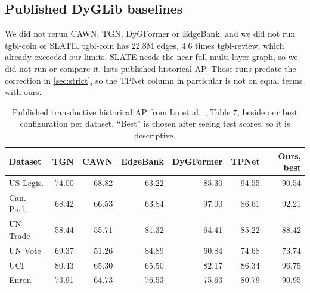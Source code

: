 \documentclass[11pt,a4paper]{article}
\theoremstyle{remark}
\begin{document}
\subsection{Published DyGLib baselines}
We did not rerun CAWN, TGN, DyGFormer or EdgeBank, and we did not run tgbl-coin or SLATE. tgbl-coin has 22.8M edges, 4.6 times tgbl-review, which already exceeded our limits. SLATE needs the near-full multi-layer graph, so we did not run or compare it.  lists published historical AP. Those runs predate the correction in \cref{sec:strict}, so the TPNet column in particular is not on equal terms with ours.

\begin{table}[h]\centering\small
\begin{tabular}{lrrrrr|r}
\toprule
Dataset & TGN & CAWN & EdgeBank & DyGFormer & TPNet & Ours, best\\
\midrule
US Legis. & 74.00 & 68.82 & 63.22 & 85.30 & 94.55 & 90.54\\
Can. Parl. & 68.42 & 66.53 & 63.84 & 97.00 & 86.61 & 92.21\\
UN Trade & 58.44 & 55.71 & 81.32 & 64.41 & 85.22 & 88.42\\
UN Vote & 69.37 & 51.26 & 84.89 & 60.84 & 74.68 & 73.74\\
UCI & 80.43 & 65.30 & 65.50 & 82.17 & 86.34 & 96.75\\
Enron & 73.91 & 64.73 & 76.53 & 75.63 & 80.79 & 90.95\\
\bottomrule
\end{tabular}
\caption{Published transductive historical AP from Lu et al.\ \cite{tpnet}, Table 7, beside our best configuration per dataset. ``Best'' is chosen after seeing test scores, so it is descriptive.}\label{tab:published}
\end{table}
\end{document}
